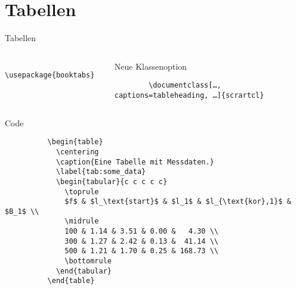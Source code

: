 \section{Tabellen}

\begin{frame}[fragile]{Tabellen}
  \begin{columns}[t]
    \begin{column}{0.33\textwidth}
      \begin{Packages}
        \begin{lstlisting}
          \usepackage{booktabs}
        \end{lstlisting}
      \end{Packages}
    \end{column}
    \begin{column}{0.63\textwidth}
    \begin{tblock}{Neue Klassenoption}
      \begin{lstlisting}
        \documentclass[…, captions=tableheading, …]{scrartcl}
      \end{lstlisting}
    \end{tblock}
    \end{column}
  \end{columns}
  \vspace{-2pt}
  \begin{columns}[onlytextwidth, t]
    \begin{column}{0.60\textwidth}
      \fontsize{8}{6}
      \begin{tblock}{Code}
        \begin{lstlisting}
          \begin{table}
            \centering
            \caption{Eine Tabelle mit Messdaten.}
            \label{tab:some_data}
            \begin{tabular}{c c c c c}
              \toprule
              $f$ & $l_\text{start}$ & $l_1$ & $l_{\text{kor},1}$ & $B_1$ \\
              \midrule
              100 & 1.14 & 3.51 & 0.00 &   4.30 \\
              300 & 1.27 & 2.42 & 0.13 &  41.14 \\
              500 & 1.21 & 1.70 & 0.25 & 168.73 \\
              \bottomrule
            \end{tabular}
          \end{table}
        \end{lstlisting}
      \end{tblock}

\end{column}
\end{columns}
\end{frame}
